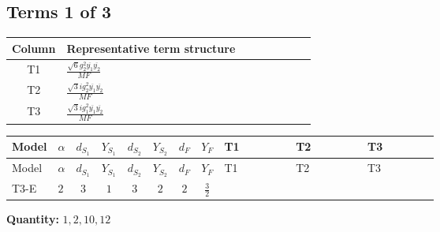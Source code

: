 \documentclass[8pt]{article}
\begin{document}
\begin{landscape}
\subsection*{Terms 1 of 3}
\begin{center}
\begin{tabular}{@{}c >{\raggedright\arraybackslash}p{0.82\linewidth}@{}}
\toprule
Column & Representative term structure \\
\midrule
T1 & \(\displaystyle \frac{\sqrt{6} g_{2}^{2} \overline{y_{1}} \overline{y_{2}}}{MF}\) \\
\midrule
T2 & \(\displaystyle \frac{\sqrt{3} i g_{2}^{2} \overline{y_{1}} \overline{y_{2}}}{MF}\) \\
\midrule
T3 & \(\displaystyle \frac{\sqrt{3} i g_{1}^{2} \overline{y_{1}} \overline{y_{2}}}{MF}\) \\
\midrule
\bottomrule
\end{tabular}
\end{center}
\smallskip
\tiny
\begin{longtable}{@{}llcccccc >{\raggedright\arraybackslash}p{0.21\linewidth} >{\raggedright\arraybackslash}p{0.21\linewidth} >{\raggedright\arraybackslash}p{0.21\linewidth}@{}}
\toprule
Model & $\alpha$ & $d_{S_1}$ & $Y_{S_1}$ & $d_{S_2}$ & $Y_{S_2}$ & $d_F$ & $Y_F$ & T1 & T2 & T3 \\
\midrule
\endfirsthead
\toprule
Model & $\alpha$ & $d_{S_1}$ & $Y_{S_1}$ & $d_{S_2}$ & $Y_{S_2}$ & $d_F$ & $Y_F$ & T1 & T2 & T3 \\
\midrule
\endhead
T3-E & $2$ & $3$ & $1$ & $3$ & $2$ & $2$ & $\frac{3}{2}$ & \scriptsize\adjustbox{max width=\linewidth}{$\begin{gathered} - \frac{\sqrt{6} g_{2}^{2} \overline{y_{1}} \overline{y_{2}}}{6 MF}\end{gathered}$} & \scriptsize\adjustbox{max width=\linewidth}{$\begin{gathered} - \frac{15 \sqrt{3} i g_{2}^{2} \overline{y_{1}} \overline{y_{2}}}{8 MF}\end{gathered}$} & \scriptsize\adjustbox{max width=\linewidth}{$\begin{gathered} - \frac{9 \sqrt{3} i g_{1}^{2} \overline{y_{1}} \overline{y_{2}}}{8 MF}\end{gathered}$} \\
\midrule
\bottomrule
\end{longtable}
\clearpage
\noindent\textbf{Quantity: }$\mathrm{1,2,10,12}$\par\smallskip

\end{landscape}
\end{document}
